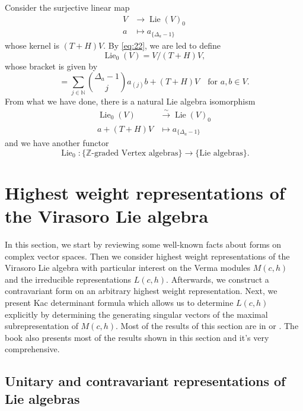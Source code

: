 \documentclass[a4paper, 12pt, reqno]{amsart}
\theoremstyle{remark}
\numberwithin{equation}{subsection}
\DeclareMathOperator{\Lie}{Lie}
\begin{document}
Consider the surjective linear map
\begin{align*}
  V &\to \Lie(V)_0 \\
  a &\mapsto a_{\{\Delta_a - 1\}}
\end{align*}
whose kernel is $(T + H)V$.
By \eqref{eq:22}, we are led to define
\begin{equation*}
  \Lie_0(V) = V/(T + H)V,
\end{equation*}
whose bracket is given by
\begin{equation*}
  [a + (T + H)V, b + (T + H)V] = \sum_{j \in \mathbb{N}}\binom{\Delta_a - 1}{j}a_{(j)}b + (T + H)V \quad \text{for }a, b \in V.
\end{equation*}
From what we have done, there is a natural Lie algebra isomorphism
\begin{align*}
  \Lie_0(V) &\xrightarrow{\sim} \Lie(V)_0 \\
  a + (T + H)V &\mapsto a_{\{\Delta_a - 1\}}
\end{align*}
and we have another functor
\begin{equation*}
  \Lie_0: \{\text{$\mathbb{Z}$-graded Vertex algebras}\} \to \{\text{Lie algebras}\}.
\end{equation*}

\section{Highest weight representations of the Virasoro Lie algebra}
\label{sec:high-weight-repr}

In this section, we start by reviewing some well-known facts about forms on complex vector spaces.
Then we consider highest weight representations of the Virasoro Lie algebra with particular interest on the Verma modules $M(c, h)$ and the irreducible representations $L(c, h)$.
Afterwards, we construct a contravariant form on an arbitrary highest weight representation.
Next, we present Kac determinant formula which allows us to determine $L(c, h)$ explicitly by determining the generating singular vectors of the maximal subrepresentation of $M(c, h)$.
Most of the results of this section are in \cite{kac_bombay_2013} or \cite{astashkevich_structure_1997}.
The book \cite{iohara_representation_2011} also presents most of the results shown in this section and it's very comprehensive.

\subsection{Unitary and contravariant representations of Lie algebras}
\label{sec:unit-contr-repr}
\end{document}
